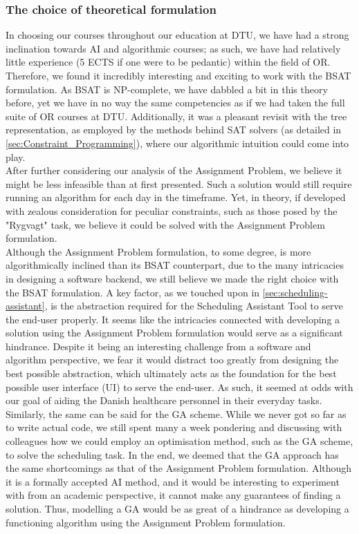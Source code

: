 \subsubsection*{The choice of theoretical formulation}
In choosing our courses throughout our education at DTU, we have had a strong inclination towards AI and algorithmic courses; as such, we have had relatively little experience (5 ECTS if one were to be pedantic) within the field of OR. Therefore, we found it incredibly interesting and exciting to work with the BSAT formulation. As BSAT is NP-complete, we have dabbled a bit in this theory before, yet we have in no way the same competencies as if we had taken the full suite of OR courses at DTU. Additionally, it was a pleasant revisit with the tree representation, as employed by the methods behind SAT solvers (as detailed in \autoref{sec:Constraint_Programming}), where our algorithmic intuition could come into play.
\\
After further considering our analysis of the Assignment Problem, we believe it might be less infeasible than at first presented. Such a solution would still require running an algorithm for each day in the timeframe. Yet, in theory, if developed with zealous consideration for peculiar constraints, such as those posed by the "Rygvagt" task, we believe it could be solved with the Assignment Problem formulation.
\\
Although the Assignment Problem formulation, to some degree, is more algorithmically inclined than its BSAT counterpart, due to the many intricacies in designing a software backend, we still believe we made the right choice with the BSAT formulation. A key factor, as we touched upon in \autoref{sec:scheduling-assistant}, is the abstraction required for the Scheduling Assistant Tool to serve the end-user properly. It seems like the intricacies connected with developing a solution using the Assignment Problem formulation would serve as a significant hindrance. Despite it being an interesting challenge from a software and algorithm perspective, we fear it would distract too greatly from designing the best possible abstraction, which ultimately acts as the foundation for the best possible user interface (UI) to serve the end-user. As such, it seemed at odds with our goal of aiding the Danish healthcare personnel in their everyday tasks.
\\
Similarly, the same can be said for the GA scheme. While we never got so far as to write actual code, we still spent many a week pondering and discussing with colleagues how we could employ an optimisation method, such as the GA scheme, to solve the scheduling task. In the end, we deemed that the GA approach has the same shortcomings as that of the Assignment Problem formulation. Although it is a formally accepted AI method, and it would be interesting to experiment with from an academic perspective, it cannot make any guarantees of finding a solution. Thus, modelling a GA would be as great of a hindrance as developing a functioning algorithm using the Assignment Problem formulation.

